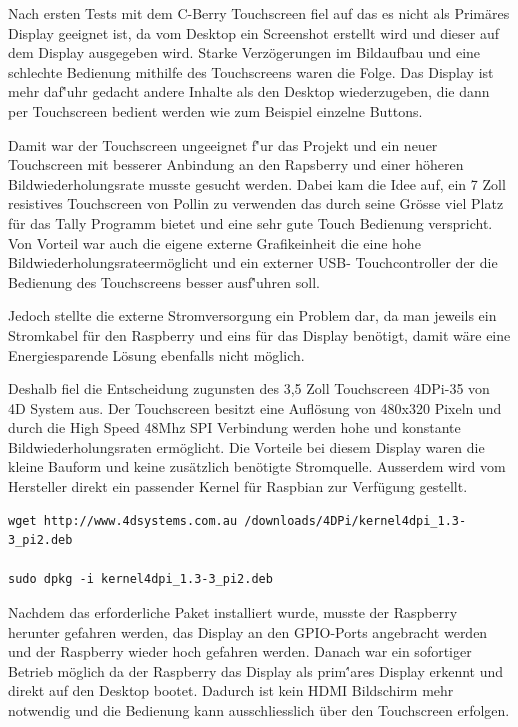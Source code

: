 \documentclass[11pt,a4paper]{article} %
\begin{document}
Nach ersten Tests mit dem C-Berry Touchscreen fiel auf das es nicht als Prim\"ares Display geeignet ist, da vom Desktop ein Screenshot erstellt wird und dieser auf dem Display ausgegeben wird. Starke Verz\"ogerungen im Bildaufbau und eine schlechte Bedienung mithilfe des Touchscreens waren die Folge. Das Display ist mehr daf\''uhr gedacht andere Inhalte als den Desktop wiederzugeben, die dann per Touchscreen bedient werden wie zum Beispiel einzelne Buttons.
\par
Damit war der Touchscreen ungeeignet f\''ur das Projekt und ein neuer Touchscreen mit besserer Anbindung an den Rapsberry und einer h\"oheren Bildwiederholungsrate musste gesucht werden. Dabei kam die Idee auf, ein 7 Zoll resistives Touchscreen von Pollin zu verwenden das durch seine Gr\"osse viel Platz f\"ur das Tally Programm bietet und eine sehr gute Touch Bedienung verspricht. Von Vorteil war auch die eigene externe Grafikeinheit die eine hohe Bildwiederholungsrateerm\"oglicht  und ein externer USB- Touchcontroller der die Bedienung des Touchscreens besser ausf\''uhren soll.
\par
Jedoch stellte die externe Stromversorgung ein Problem dar, da man jeweils ein Stromkabel f\"ur den Raspberry und eins f\"ur das Display ben\"otigt, damit w\"are eine Energiesparende L\"osung ebenfalls nicht m\"oglich.
\par
Deshalb fiel die Entscheidung zugunsten des 3,5 Zoll Touchscreen 4DPi-35 von 4D System aus. Der Touchscreen besitzt eine Aufl\"osung von 480x320 Pixeln und durch die High Speed 48Mhz SPI Verbindung werden hohe und konstante Bildwiederholungsraten erm\"oglicht.
Die Vorteile bei diesem Display waren die kleine Bauform und keine zus\"atzlich ben\"otigte Stromquelle. Ausserdem wird vom Hersteller direkt ein passender Kernel f\"ur Raspbian zur Verf\"ugung gestellt.
\begin{frame}

\begin{lstlisting}
wget http://www.4dsystems.com.au /downloads/4DPi/kernel4dpi_1.3-3_pi2.deb 

sudo dpkg -i kernel4dpi_1.3-3_pi2.deb
\end{lstlisting}

\end{frame}

 Nachdem das erforderliche Paket installiert wurde, musste der Raspberry herunter gefahren werden,  das Display an den GPIO-Ports angebracht werden und der Raspberry wieder hoch gefahren werden. Danach war ein sofortiger Betrieb m\"oglich da der Raspberry das Display als prim\''ares Display erkennt und direkt auf den Desktop bootet. Dadurch ist kein HDMI Bildschirm mehr notwendig und die Bedienung kann ausschliesslich \"uber den Touchscreen erfolgen.
\par
\end{document}
